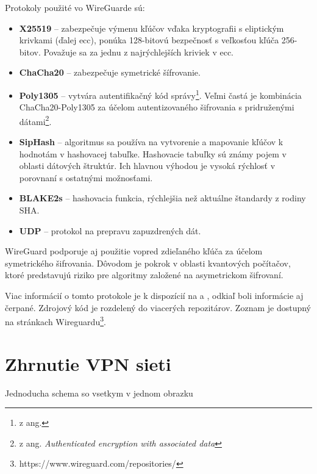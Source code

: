 Protokoly použité vo WireGuarde sú:
\begin{itemize}
	\item{\textbf{X25519}} \cite{x25519} -- zabezpečuje výmenu kľúčov vďaka kryptografii s eliptickým krivkami \cite{ecc} (ďalej \acrshort{ecc}), ponúka 128-bitovú bezpečnosť s veľkosťou kľúča 256-bitov. Považuje sa za jednu z najrýchlejších kriviek v \acrshort{ecc}.
	\item{\textbf{ChaCha20}} \cite{chacha} -- zabezpečuje symetrické šífrovanie.
	\item{\textbf{Poly1305}} \cite{poly} -- vytvára autentifikačný kód správy\footnote{z ang. }. Veľmi častá je kombinácia ChaCha20-Poly1305 za účelom autentizovaného šifrovania s pridruženými dátami\footnote{z ang. \textit{Authenticated encryption with associated data}}.
	\item{\textbf{SipHash}} \cite{siphash} -- algoritmus sa používa na vytvorenie a mapovanie kľúčov k hodnotám v hashovacej tabuľke. Hashovacie tabuľky sú známy pojem v oblasti dátových štruktúr. Ich hlavnou výhodou je vysoká rýchlosť v porovnaní s ostatnými možnosťami.  
	\item{\textbf{BLAKE2s}} \cite{blake} -- hashovacia funkcia, rýchlejšia než aktuálne štandardy z rodiny SHA. 
	\item{\textbf{UDP}} --  protokol na prepravu zapuzdrených dát.
\end{itemize} 
WireGuard podporuje aj použitie vopred zdieľaného kľúča za účelom symetrického šifrovania. Dôvodom je pokrok v oblasti kvantových počítačov, ktoré predstavujú riziko pre algoritmy založené na asymetrickom šifrovaní.

Viac informácií o tomto protokole je k dispozícií na \cite{wireguard} a \cite{wireguardpdf}, odkiaľ boli informácie aj čerpané. Zdrojový kód je rozdelený do viacerých repozitárov. Zoznam je dostupný na stránkach Wireguardu\footnote{https://www.wireguard.com/repositories/}.
\section{Zhrnutie VPN sieti}
Jednoducha schema so vsetkym v jednom obrazku \\


